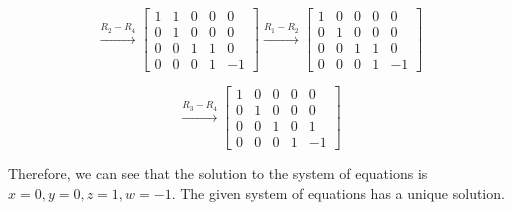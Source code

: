 \begin{equation*}
    \xrightarrow{R_2 - R_4}
    \begin{bmatrix}
        1 & 1 & 0 & 0 & 0  \\
        0 & 1 & 0 & 0 & 0  \\
        0 & 0 & 1 & 1 & 0  \\
        0 & 0 & 0 & 1 & -1
    \end{bmatrix}
    \xrightarrow{R_1 - R_2}
    \begin{bmatrix}
        1 & 0 & 0 & 0 & 0  \\
        0 & 1 & 0 & 0 & 0  \\
        0 & 0 & 1 & 1 & 0  \\
        0 & 0 & 0 & 1 & -1
    \end{bmatrix}
\end{equation*}

\begin{equation*}
    \xrightarrow{R_3 - R_4}
    \begin{bmatrix}
        1 & 0 & 0 & 0 & 0  \\
        0 & 1 & 0 & 0 & 0  \\
        0 & 0 & 1 & 0 & 1  \\
        0 & 0 & 0 & 1 & -1
    \end{bmatrix}
\end{equation*}

Therefore, we can see that the solution to the system of equations is \( x = 0, y = 0, z = 1, w = -1 \).
The given system of equations has a unique solution.
